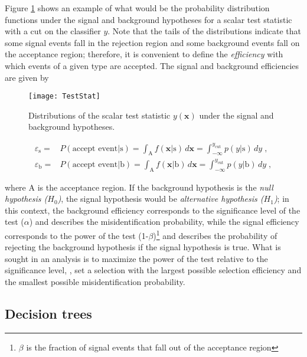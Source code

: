 Figure \ref{fig:scalar_test} shows an example of what would be the probability distribution functions under the signal and background hypotheses for a scalar test statistic with a cut on the classifier $y$.
Note that the tails of the distributions indicate that some signal events fall in the rejection region and some background events fall on the acceptance region; therefore, it is convenient to define the \textit{efficiency} with which events of a given type are accepted. The signal and background efficiencies are given by 

\begin{figure}[!h]
  \centering
  \texttt{[image: TestStat]}
  \caption[Scalar test statistical.]{Distributions of the scalar test statistic $y(\textbf{x})$ under the signal and background hypotheses.\cite{mva}}\label{fig:scalar_test}
\end{figure}

\begin{align}
\label{eq:sigeff}
\varepsilon_{\textrm{s}}  = & P( \mbox{accept event} | \mbox{s} ) = \int_{\textrm{A}} f(\textbf{x} | \mbox{s} ) \, d \textbf{x} = \int_{-\infty}^{y_{\textrm{cut}}} p(y | \mbox{s}) \, dy\;, \\
\varepsilon_{\textrm{b}}  = & P( \mbox{accept event} | \mbox{b} ) = \int_{\textrm{A}} f(\textbf{x} | \mbox{b} ) \, d \textbf{x} = \int_{-\infty}^{y_{\textrm{cut}}} p(y | \mbox{b}) \, dy \;,
\end{align}

\noindent where A is the acceptance region. If the background hypothesis is the \textit{null hypothesis ($H_0$)}, the signal hypothesis would be \textit{alternative hypothesis ($H_1$)}; in this context, the background efficiency corresponds to the significance level of the test ($\alpha$) and describes the misidentification probability, while the signal efficiency corresponds to the power of the test (1-$\beta$)\footnote{$\beta$ is the fraction of signal events that fall out of the acceptance region} and describes the probability of rejecting the background hypothesis if the signal hypothesis is true. What is sought in an analysis is to maximize the power of the test relative to the significance level, \ie, set a selection with the largest possible selection efficiency and the smallest possible misidentification probability.

\subsection{Decision trees }

